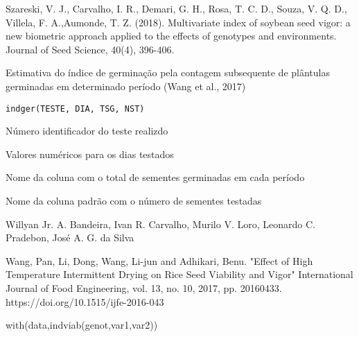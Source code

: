 \documentclass[a4paper]{book}
\begin{document}
%
\begin{References}
Szareski, V. J., Carvalho, I. R., Demari, G. H., Rosa, T. C. D.,
Souza, V. Q. D., Villela, F. A.,Aumonde, T. Z. (2018).
Multivariate index of soybean seed vigor:
a new biometric approach applied to the effects of genotypes and
environments. Journal of Seed Science, 40(4), 396-406.
\end{References}
%
\begin{SeeAlso}
\end{SeeAlso}
%
\begin{Description}
Estimativa do índice de germinação pela contagem subsequente de plântulas
germinadas em determinado período (Wang et al., 2017)
\end{Description}
%
\begin{Usage}
\begin{verbatim}
indger(TESTE, DIA, TSG, NST)
\end{verbatim}
\end{Usage}
%
\begin{Arguments}
\begin{ldescription}
\item[\code{TESTE}] Número identificador do teste realizdo

\item[\code{DIA}] Valores numéricos para os dias testados

\item[\code{TSG}] Nome da coluna com o total de sementes germinadas em cada período

\item[\code{NST}] Nome da coluna padrão com o número de sementes testadas
\end{ldescription}
\end{Arguments}
%
\begin{Author}
Willyan Jr. A. Bandeira, Ivan R. Carvalho, Murilo V. Loro,
Leonardo C. Pradebon, José A. G. da Silva
\end{Author}
%
\begin{References}
Wang, Pan, Li, Dong, Wang, Li-jun and Adhikari, Benu. "Effect of High
Temperature Intermittent Drying on Rice Seed Viability and Vigor" International
Journal of Food Engineering, vol. 13, no. 10, 2017, pp. 20160433.
https://doi.org/10.1515/ijfe-2016-043
\end{References}
%
\begin{Examples}
\begin{ExampleCode}
with(data,indviab(genot,var1,var2))
\end{ExampleCode}
\end{Examples}
\end{document}
